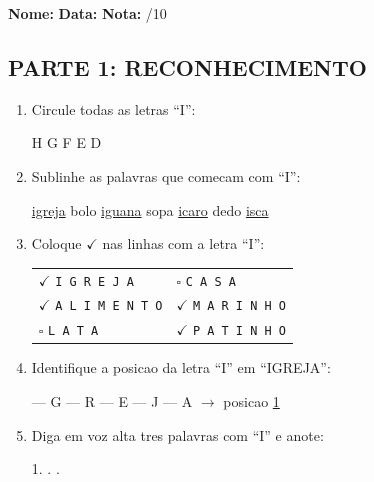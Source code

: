 \begin{exercicio}
\noindent\textbf{Nome:} \underline{\hspace{3.2cm}} \quad \textbf{Data:} \underline{\hspace{1.6cm}} \quad \textbf{Nota:} \underline{\hspace{0.9cm}}/10

\subsection*{PARTE 1: RECONHECIMENTO}

\begin{enumerate}
  \item Circule todas as letras ``I'':
  \begin{center}
   \quad H \quad {} \quad G \quad {} \quad F \quad {} \quad E \quad {} \quad D
  \end{center}

  \item Sublinhe as palavras que comecam com ``I'':
  \begin{center}
  \uline{igreja} \quad bolo \quad \uline{iguana} \quad sopa \quad \uline{icaro} \quad dedo \quad \uline{isca}
  \end{center}

  \item Coloque $\checkmark$ nas linhas com a letra ``I'':
  \begin{center}
  \begin{tabular}{ll}
  $\checkmark$ \texttt{I G R E J A} & $\square$ \texttt{C A S A} \\
  $\checkmark$ \texttt{A L I M E N T O} & $\checkmark$ \texttt{M A R I N H O} \\
  $\square$ \texttt{L A T A} & $\checkmark$ \texttt{P A T I N H O}
  \end{tabular}
  \end{center}

  \item Identifique a posicao da letra ``I'' em ``IGREJA'':
  \begin{center}
   --- G --- R --- E --- J --- A $\rightarrow$ posicao \underline{1}
  \end{center}

  \item Diga em voz alta tres palavras com ``I'' e anote:
  \begin{center}
  1. \underline{\hspace{4cm}} . \underline{\hspace{4cm}} . \underline{\hspace{4cm}}
  \end{center}
\end{enumerate}


\end{exercicio}
